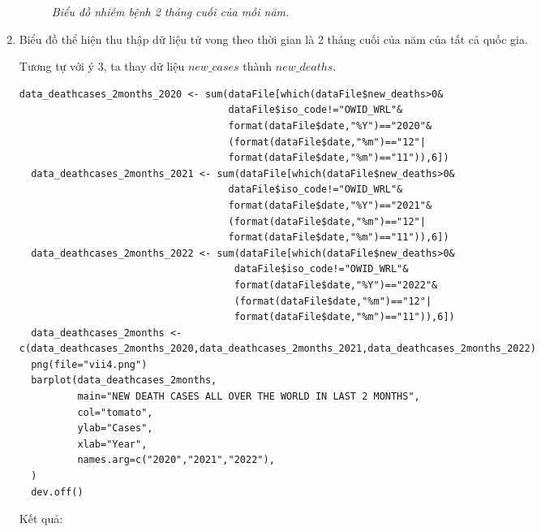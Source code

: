 \documentclass[a4paper]{article}
\theoremstyle{definition}
\begin{document}
\begin{enumerate}[1)]
\begin{figure}[H]
\begin{center}
        \end{center}
        \vspace{+3mm}\caption{\it Biểu đồ nhiễm bệnh 2 tháng cuối của mỗi năm.}
    \end{figure}
\item Biểu đồ thể hiện thu thập dữ liệu tử vong theo thời gian là 2 tháng cuối của năm của tất cả quốc gia.

Tương tự với ý 3, ta thay dữ liệu $new\_cases$ thành $new\_deaths$.
\begin{lstlisting}
data_deathcases_2months_2020 <- sum(dataFile[which(dataFile$new_deaths>0&
                                    dataFile$iso_code!="OWID_WRL"&
                                    format(dataFile$date,"%Y")=="2020"&
                                    (format(dataFile$date,"%m")=="12"|
                                    format(dataFile$date,"%m")=="11")),6]) 
  data_deathcases_2months_2021 <- sum(dataFile[which(dataFile$new_deaths>0&
                                    dataFile$iso_code!="OWID_WRL"&
                                    format(dataFile$date,"%Y")=="2021"&
                                    (format(dataFile$date,"%m")=="12"|
                                    format(dataFile$date,"%m")=="11")),6])
  data_deathcases_2months_2022 <- sum(dataFile[which(dataFile$new_deaths>0&
                                     dataFile$iso_code!="OWID_WRL"&
                                     format(dataFile$date,"%Y")=="2022"&
                                     (format(dataFile$date,"%m")=="12"|
                                     format(dataFile$date,"%m")=="11")),6])
  data_deathcases_2months <- c(data_deathcases_2months_2020,data_deathcases_2months_2021,data_deathcases_2months_2022)
  png(file="vii4.png")
  barplot(data_deathcases_2months,
          main="NEW DEATH CASES ALL OVER THE WORLD IN LAST 2 MONTHS",
          col="tomato",
          ylab="Cases",
          xlab="Year",
          names.arg=c("2020","2021","2022"),
  )
  dev.off()
\end{lstlisting}
Kết quả:
\begin{figure}[H]
        \begin{center}

\end{center}
\end{figure}
\end{enumerate}
\end{document}
